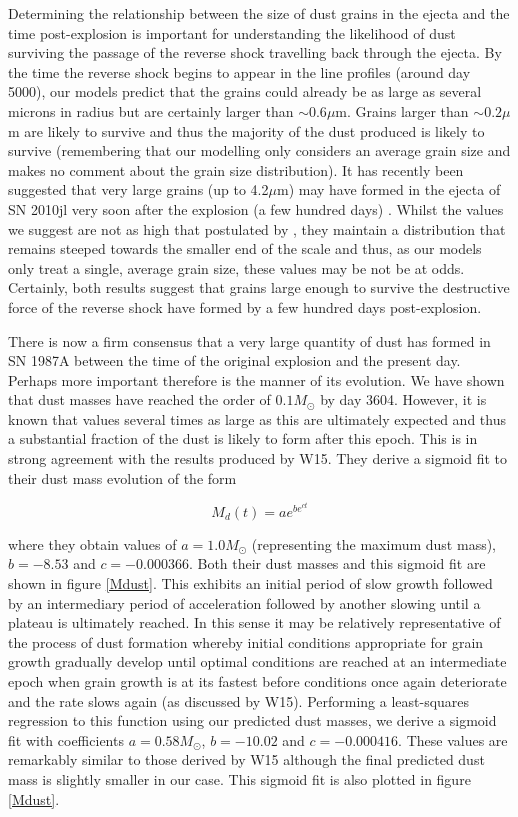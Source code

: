\documentclass[useAMS,usenatbib,usegraphicx]{mnras}
\begin{document}
Determining the relationship between the size of dust grains in the ejecta and the time post-explosion is important for understanding the likelihood of dust surviving the passage of the reverse shock travelling back through the ejecta. By the time the reverse shock begins to appear in the line profiles (around day 5000), our models predict that the grains could already be as large as several microns in radius but are certainly larger than $\sim 0.6\mu$m.  Grains larger than $\sim 0.2\mu$m are likely to survive and thus the majority of the dust produced is likely to survive (remembering that our modelling only considers an average grain size and makes no comment about the grain size distribution).  It has recently been suggested that very large grains (up to 4.2$\mu$m) may have formed in the ejecta of SN 2010jl very soon after the explosion (a few hundred days) \cite{Gall2014}.  Whilst the values we suggest are not as high that postulated by \citet{Gall2014}, they maintain a distribution that remains steeped towards the smaller end of the scale and thus, as our models only treat a single, average grain size, these values may be not be at odds.  Certainly, both results suggest that grains large enough to survive the destructive force of the reverse shock have formed by a few hundred days post-explosion. 

There is now a firm consensus that a very large quantity of dust has formed in SN 1987A between the time of the original explosion and the present day.  Perhaps more important therefore is the manner of its evolution.  We have shown that dust masses have reached the order of $0.1M_{\odot}$ by day 3604.  However, it is known that values several times as large as this are ultimately expected and thus a substantial fraction of the dust is likely to form after this epoch.  This is in strong agreement with the results produced by W15.  They derive a sigmoid fit to their dust mass evolution of the form

\[
M_d(t)=ae^{be^{ct}}
\]
 
where they obtain values of $a=1.0M_{\odot}$ (representing the maximum dust mass), $b=-8.53$ and $c=-0.000366$.  Both their dust masses and this sigmoid fit are shown in figure \ref{Mdust}.  This exhibits an initial period of slow growth followed by an intermediary period of acceleration followed by another slowing until a plateau is ultimately reached.  In this sense it may be relatively representative of the process of dust formation whereby initial conditions appropriate for grain growth gradually develop until optimal conditions are reached at an intermediate epoch when grain growth is at its fastest before conditions once again deteriorate and the rate slows again (as discussed by W15).  Performing a least-squares regression to this function using our predicted dust masses, we derive a sigmoid fit with coefficients $a=0.58M_{\odot}$, $b=-10.02$ and $c=-0.000416$.  These values are remarkably similar to those derived by W15 although the final predicted dust mass is slightly smaller in our case.  This sigmoid fit is also plotted in figure \ref{Mdust}.
\end{document}
